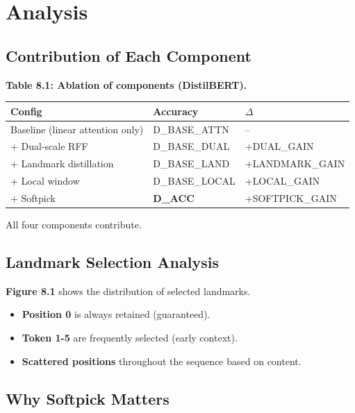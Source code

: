 \section{Analysis}

\subsection{Contribution of Each Component}

\textbf{Table 8.1: Ablation of components (DistilBERT).}

\begin{table}[H]
\centering
\small
\begin{tabular}{lll}
\toprule
\textbf{Config} & \textbf{Accuracy} & \textbf{$\Delta$} \\
\midrule
Baseline (linear attention only) & {{D\_BASE\_ATTN}} & -- \\
+ Dual-scale RFF & {{D\_BASE\_DUAL}} & +{{DUAL\_GAIN}} \\
+ Landmark distillation & {{D\_BASE\_LAND}} & +{{LANDMARK\_GAIN}} \\
+ Local window & {{D\_BASE\_LOCAL}} & +{{LOCAL\_GAIN}} \\
+ Softpick & \textbf{{{D\_ACC}}} & +{{SOFTPICK\_GAIN}} \\
\bottomrule
\end{tabular}
\end{table}

All four components contribute.

\subsection{Landmark Selection Analysis}

\textbf{Figure 8.1} shows the distribution of selected landmarks.

\begin{itemize}
\item \textbf{Position 0} is always retained (guaranteed).
\item \textbf{Token 1-5} are frequently selected (early context).
\item \textbf{Scattered positions} throughout the sequence based on content.

\end{itemize}
\subsection{Why Softpick Matters}

